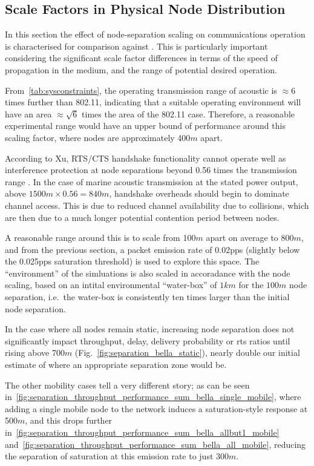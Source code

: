 \clearpage

\subsection{Scale Factors in Physical Node Distribution}

In this section the effect of node-separation scaling on communications operation is characterised for comparison against \cite{Guo11}. 
This is particularly important considering the significant scale factor differences in terms of the speed of propagation in the medium, and the range of potential desired operation.

From~\autoref{tab:sysconstraints}, the operating transmission range of acoustic is $\approx 6$ times further than 802.11, indicating that a suitable operating environment will have an area $\approx \sqrt{6}$ times the area of the 802.11 case. Therefore, a reasonable experimental range would have an upper bound of performance around this scaling factor, where nodes are approximately 400$m$ apart. 

According to Xu, RTS/CTS handshake functionality cannot operate well as interference protection at node separations beyond 0.56 times the transmission range \cite{Xu2002}.
In the case of marine acoustic transmission at the stated power output, above $1500m \times 0.56 = 840m$, handshake overheads should begin to dominate channel access.
This is due to reduced channel availability due to collisions, which are then due to a much longer potential contention period between nodes. 

A reasonable range around this is to scale from 100$m$ apart on average to 800$m$, and from the previous section, a packet emission rate of 0.02pps (slightly below the 0.025pps saturation threshold) is used to explore this space.
The ``environment'' of the simluations is also scaled in accoradance with the node scaling, based on an intital environmental ``water-box'' of $1km$ for the $100m$ node separation, i.e.\ the water-box is consistently ten times larger than the initial node separation.

In the case where all nodes remain static, increasing node separation does not significantly impact throughput, delay, delivery probability or \gls{rts} ratios until rising above 700$m$ (Fig.~\ref{fig:separation_bella_static}), nearly double our initial estimate of where an appropriate separation zone would be.

The other mobility cases tell a very different story; as can be seen in~\autoref{fig:separation_throughput_performance_sum_bella_single_mobile}, where adding a single mobile node to the network induces a saturation-style response at 500$m$, and this drops further in~\autoref{fig:separation_throughput_performance_sum_bella_allbut1_mobile} and~\autoref{fig:separation_throughput_performance_sum_bella_all_mobile}, reducing the separation of saturation at this emission rate to just 300$m$.

